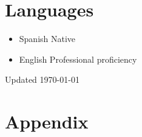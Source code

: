 \documentclass{academiccv}
\begin{document}


\section*{Languages}
\begin{itemize}
	\item Spanish \tab Native
	\item English \tab Professional proficiency
\end{itemize}

\begin{center}
\vspace{6em}
Updated \monthyeardate\today
\end{center}

\newpage

\section*{Appendix}
\end{document}
